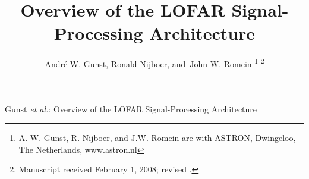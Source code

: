 \documentclass[journal]{IEEEtran}
\begin{document}
%
\title{Overview of the LOFAR Signal-Processing Architecture}
%
%
%

\author{Andr\'{e} W. Gunst,
        Ronald Nijboer,
        and~John W. Romein%
\thanks{A. W. Gunst, R. Nijboer, and J.W. Romein are with ASTRON, Dwingeloo, 
The Netherlands, www.astron.nl
}%
\thanks{Manuscript received February 1, 2008; revised .}}

% 
%



%
{Gunst \MakeLowercase{\textit{et al.}}: Overview of the LOFAR Signal-Processing Architecture}
% 
\end{document}
